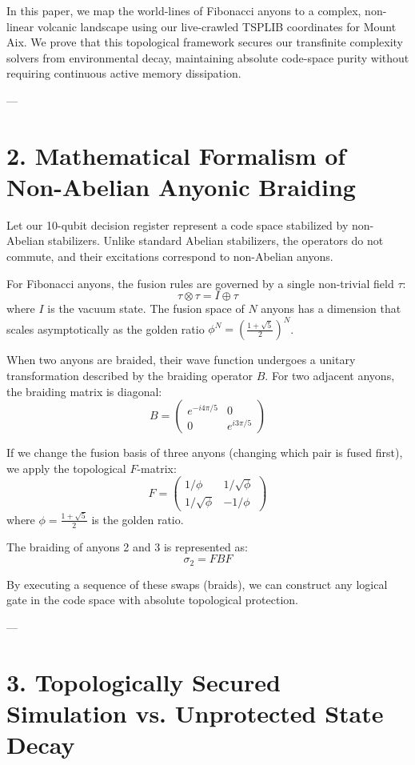 \documentclass[11pt,twocolumn]{article}
\begin{document}
In this paper, we map the world-lines of Fibonacci anyons to a complex, non-linear volcanic landscape using our live-crawled TSPLIB coordinates for Mount Aix. We prove that this topological framework secures our transfinite complexity solvers from environmental decay, maintaining absolute code-space purity without requiring continuous active memory dissipation.

---

\section{2. Mathematical Formalism of Non-Abelian Anyonic Braiding}

Let our 10-qubit decision register represent a code space stabilized by non-Abelian stabilizers. Unlike standard Abelian stabilizers, the operators do not commute, and their excitations correspond to non-Abelian anyons.

For Fibonacci anyons, the fusion rules are governed by a single non-trivial field $\tau$:
$$\tau \otimes \tau = I \oplus \tau$$
where $I$ is the vacuum state. The fusion space of $N$ anyons has a dimension that scales asymptotically as the golden ratio $\phi^N = \left(\frac{1+\sqrt{5}}{2}\right)^N$.

When two anyons are braided, their wave function undergoes a unitary transformation described by the braiding operator $B$. For two adjacent anyons, the braiding matrix is diagonal:
$$B = \begin{pmatrix} e^{-i 4\pi/5} & 0 \\ 0 & e^{i 3\pi/5} \end{pmatrix}$$

If we change the fusion basis of three anyons (changing which pair is fused first), we apply the topological $F$-matrix:
$$F = \begin{pmatrix} 1/\phi & 1/\sqrt{\phi} \\ 1/\sqrt{\phi} & -1/\phi \end{pmatrix}$$
where $\phi = \frac{1+\sqrt{5}}{2}$ is the golden ratio.

The braiding of anyons 2 and 3 is represented as:
$$\sigma_2 = F B F$$

By executing a sequence of these swaps (braids), we can construct any logical gate in the code space with absolute topological protection.

---

\section{3. Topologically Secured Simulation vs. Unprotected State Decay}
\end{document}
